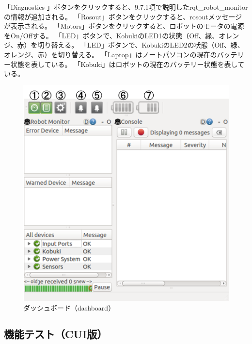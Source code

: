 \begin{itemize}
\setcounter{num}{0}
\circled{\thenum} 「Diagnostics   」ボタンをクリックすると、9.7.1項で説明したrqt\_robot\_monitorの情報が追加される。
\circled{\thenum}「Rosout」ボタンをクリックすると、rosoutメッセージが表示される。
\circled{\thenum}「Motors」ボタンをクリックすると、ロボットのモータの電源をOn/Offする。
\circled{\thenum}「LED」ボタンで、KobukiのLED1の状態（Off、緑、オレンジ、赤）を切り替える。
\circled{\thenum}「LED」ボタンで、KobukiのLED2の状態（Off、緑、オレンジ、赤）を切り替える。
\circled{\thenum}「Laptop」はノートパソコンの現在のバッテリー状態を表している。
\circled{\thenum}「Kobuki」はロボットの現在のバッテリー状態を表している。

\begin{figure}[ht]
  \centering
  \includegraphics[width=\columnwidth]{pictures/chapter9/pic_09_15.png}
  \caption{ダッシュボード（dashboard）}
\end{figure}

\subsection{機能テスト（CUI版）}


\end{itemize}
